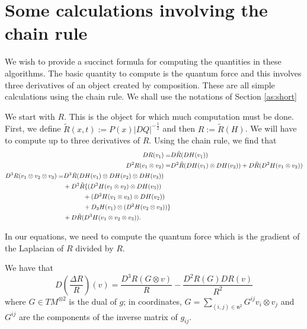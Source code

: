 \documentclass[11pt]{article}
\theoremstyle{remark}
\begin{document}
\section{Some calculations involving the chain rule}

We wish to provide a succinct formula for computing the quantities in
these algorithms. The basic quantity to compute is the quantum force
and this involves three derivatives of an object created by
composition.  These are all simple calculations using the chain rule. We shall
use the notations of Section \ref{as:short}


We start with $R$. This is the object for which much computation must
be done. First, we define $\ensuremath{\tilde R} (x,t) \ensuremath{:=} P(x)
\ensuremath{\lvert {DQ} \rvert}^{-\frac{1}{2}}$ and then $R \ensuremath{:=} \ensuremath{\tilde R} (H)$. We will have to compute
up to three derivatives of $R$. Using the chain rule,
we find that
\begin{align*}
DR (v_1) =& D\ensuremath{\tilde R}(DH(v_1)) \\
D^2 R (v_1 \otimes v_2) =& 
D^2\ensuremath{\tilde R} (DH(v_1)\otimes DH(v_2)) +D\ensuremath{\tilde R}(D^2H(v_1 \otimes v_2) )  
\\
\begin{split}
D^3 R (v_1 \otimes v_2 \otimes v_3)  =& 
D^3\ensuremath{\tilde R} (DH (v_1) \otimes DH (v_2 ) \otimes DH (v_3) )  \\
& +D^2\ensuremath{\tilde R} \{
(D^2H(v_1\otimes v_2) \otimes DH (v_3)) \\& 
\hspace{.43in}+(D^2H(v_1\otimes v_3) \otimes DH (v_2)) 
\\&\hspace{.43in}+
D_3H (v_1) \otimes (D^2H(v_2\otimes v_3)) \} \\
& + D\ensuremath{\tilde R}(D^3H (v_1\otimes v_2 \otimes v_3)) .
\end{split}
\end{align*}

In our equations, we need to compute the quantum force which is the gradient of
the Laplacian of $R$ divided by $R$. 


We have that 
\[
D( \frac{\ensuremath{\Delta} R}{R})(v) = \frac{D^3 R (G\otimes v)}{R} - \frac{D^2 R (G)
DR(v)}{R^2} 
\]
where $G \in TM^{\otimes 2}$ is the dual of $g$; in coordinates, $G =
\sum_{(i,j) \in \ensuremath{\mathfrak{n}}^2} G^{ij} v_i \otimes v_j $ and $G^{ij}$ are the
components of the inverse matrix of $g_{ij}$.
\end{document}
